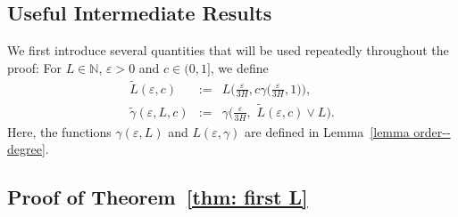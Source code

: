 \documentclass[twoside,11pt]{article}
\theoremstyle{remark}
\begin{document}
\subsection{Useful Intermediate Results}
We first introduce several quantities that will be used repeatedly throughout the proof:
For $L \in \mathbb{N}$, $\varepsilon > 0$ and $c\in (0,1]$, we define
%
\begin{eqnarray*}
\tilde{L}(\varepsilon, c) &:=& L\biggl( \frac{\varepsilon}{3H}, c \gamma\biggl( \frac{\varepsilon}{3H}, 1 \biggr) \biggr),\\
\tilde{\gamma}(\varepsilon, L,c) & := & \gamma\biggl( \frac{\varepsilon}{3H},\,\, \tilde{L}(\varepsilon,c) \vee L \biggr).
\end{eqnarray*}
%
Here, the functions $\gamma(\varepsilon, L)$ and $L(\varepsilon, \gamma)$ are defined in Lemma~\ref{lemma order--degree}.

\subsection{Proof of Theorem~\ref{thm: first L}}
\label{secsec: thm first L}
\end{document}
